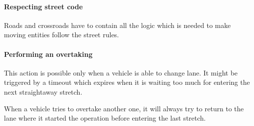 \paragraph{Respecting street code} Roads and crossroads have to contain 
all the logic which is needed to make moving entities follow the street rules.

\paragraph{Performing an overtaking} This action is possible only when a
vehicle is able to change lane. It might be triggered by a timeout which
expires when it is waiting too much for entering the next straightaway stretch.

When a vehicle tries to overtake another one, it will always try to return to
the lane where it started the operation before entering the last stretch.


